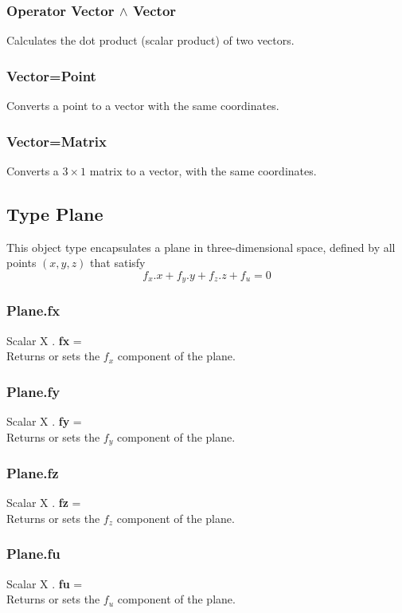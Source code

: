 \documentclass[10pt]{book}
\begin{document}
\subsubsection{Operator Vector $\wedge$ Vector \label{O:Vector^Vector}}
Calculates the dot product (scalar product) of two vectors.

\subsubsection{Vector=Point \label{C:Vector=Point}}
Converts a point to a vector with the same coordinates.

\subsubsection{Vector=Matrix \label{C:Vector=Matrix}}
Converts a $3 \times 1$ matrix  to a vector, with the same coordinates.

\subsection{Type Plane \label{T:Plane}}
This object type encapsulates a plane in three-dimensional space, defined by all points $(x,y,z)$ that satisfy
\begin{equation}
f_x . x + f_y . y + f_z . z + f_u = 0
\end{equation}

\subsubsection{Plane.fx \label{F:Plane:fx}}
Scalar X . \textbf{fx} = \\
Returns or sets the $f_x$ component of the plane.

\subsubsection{Plane.fy \label{F:Plane:fy}}
Scalar X . \textbf{fy} = \\
Returns or sets the $f_y$ component of the plane.

\subsubsection{Plane.fz \label{F:Plane:fz}}
Scalar X . \textbf{fz} = \\
Returns or sets the $f_z$ component of the plane.

\subsubsection{Plane.fu \label{F:Plane:fu}}
Scalar X . \textbf{fu} = \\
Returns or sets the $f_u$ component of the plane.
\end{document}
